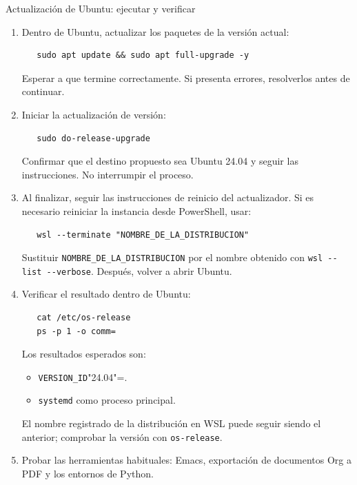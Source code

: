\documentclass[presentation]{beamer}
\begin{document}
\begin{frame}{Actualización de Ubuntu: ejecutar y verificar}
 \begin{enumerate}
\item Dentro de Ubuntu, actualizar los paquetes de la versión actual:

\begin{verbatim}
   sudo apt update && sudo apt full-upgrade -y
\end{verbatim}

Esperar a que termine correctamente. Si presenta errores,
resolverlos antes de continuar.

\item Iniciar la actualización de versión:

\begin{verbatim}
   sudo do-release-upgrade
\end{verbatim}

Confirmar que el destino propuesto sea Ubuntu 24.04 y seguir
las instrucciones. No interrumpir el proceso.

\item Al finalizar, seguir las instrucciones de reinicio del
actualizador. Si es necesario reiniciar la instancia desde
PowerShell, usar:

\begin{verbatim}
   wsl --terminate "NOMBRE_DE_LA_DISTRIBUCION"
\end{verbatim}

Sustituir \texttt{NOMBRE\_DE\_LA\_DISTRIBUCION} por el nombre obtenido
con \texttt{wsl -{}-{}list -{}-{}verbose}. Después, volver a abrir Ubuntu.

\item Verificar el resultado dentro de Ubuntu:

\begin{verbatim}
   cat /etc/os-release
   ps -p 1 -o comm=
\end{verbatim}

Los resultados esperados son:
\begin{itemize}
\item \texttt{VERSION\_ID}"24.04"=.
\item \texttt{systemd} como proceso principal.
\end{itemize}

El nombre registrado de la distribución en WSL puede seguir
siendo el anterior; comprobar la versión con \texttt{os-release}.

\item Probar las herramientas habituales: Emacs, exportación de
documentos Org a PDF y los entornos de Python.
\end{enumerate}


\end{frame}
\end{document}
